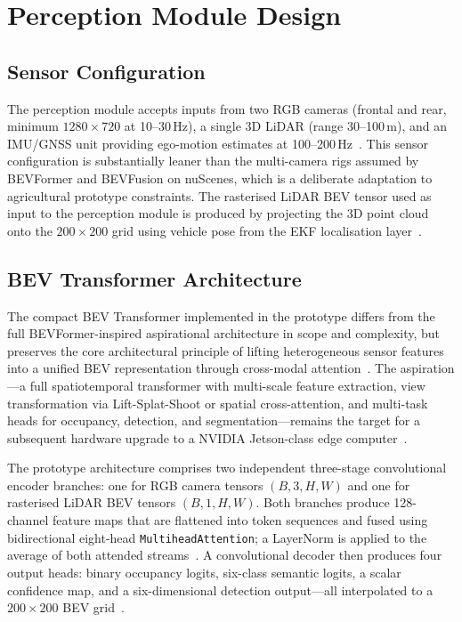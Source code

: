 \documentclass[12pt, a4paper]{article}
\begin{document}
\section{Perception Module Design}

\subsection{Sensor Configuration}

The perception module accepts inputs from two RGB cameras (frontal and rear, minimum
$1280\!\times\!720$ at 10--30\,Hz), a single 3D LiDAR (range 30--100\,m), and an
IMU/GNSS unit providing ego-motion estimates at 100--200\,Hz~\cite{ref233}. This sensor
configuration is substantially leaner than the multi-camera rigs assumed by BEVFormer and
BEVFusion on nuScenes, which is a deliberate adaptation to agricultural prototype
constraints. The rasterised LiDAR BEV tensor used as input to the perception module is
produced by projecting the 3D point cloud onto the $200\!\times\!200$ grid using vehicle
pose from the EKF localisation layer~\cite{ref233, ref234}.

\subsection{BEV Transformer Architecture}

The compact BEV Transformer implemented in the prototype differs from the full
BEVFormer-inspired aspirational architecture in scope and complexity, but preserves the
core architectural principle of lifting heterogeneous sensor features into a unified BEV
representation through cross-modal attention~\cite{ref233, ref234}. The aspiration---a
full spatiotemporal transformer with multi-scale feature extraction, view transformation
via Lift-Splat-Shoot or spatial cross-attention, and multi-task heads for occupancy,
detection, and segmentation---remains the target for a subsequent hardware upgrade to a
NVIDIA Jetson-class edge computer~\cite{ref233}.

The prototype architecture comprises two independent three-stage convolutional encoder
branches: one for RGB camera tensors $(B,3,H,W)$ and one for rasterised LiDAR BEV
tensors $(B,1,H,W)$. Both branches produce 128-channel feature maps that are flattened
into token sequences and fused using bidirectional eight-head
\texttt{MultiheadAttention}; a LayerNorm is applied to the average of both attended
streams~\cite{ref234}. A convolutional decoder then produces four output heads: binary
occupancy logits, six-class semantic logits, a scalar confidence map, and a six-dimensional
detection output---all interpolated to a $200\!\times\!200$ BEV grid~\cite{ref234}.
\end{document}
